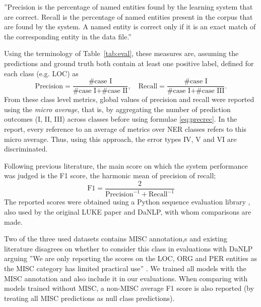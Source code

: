 \documentclass[main.tex]{subfiles}
\begin{document}
''Precision is the percentage of named entities found by the learning system that are correct.
Recall is the percentage of named entities present in the corpus that are found by the system.
A named entity is correct only if it is an exact match of the corresponding entity in the data file.''
\cite[Sec 2.4]{tjang2003conll}

Using the terminology of Table~\ref{tab:eval}, these measures are, assuming the predictions and ground truth both contain at least one positive label, defined for each class (e.g. LOC) as
\begin{equation}
    \label{eq:precrec}
    \text{Precision} = \frac{\text{\# case I}}{\text{\# case I} + \text{\# case II}},\quad \text{Recall} = \frac{\text{\# case I}}{\text{\# case I} + \text{\# case III}}.
\end{equation}
From these class level metrics, global values of precision and recall were reported using the \emph{micro average}, that is, by aggregating the number of prediction outcomes (I, II, III) across classes before using formulae \eqref{eq:precrec}.
In the report, every reference to an average of metrics over NER classes refers to this micro average.
Thus, using this approach, the error types IV, V and VI are discriminated\footnotemark.

Following previous literature, the main score on which the system performance was judged is the F1 score, the harmonic mean of precision of recall;
\begin{equation}
    \label{eq:f1}
    \text{F1} = \dfrac{2}{\text{Precision}^{-1} + \text{Recall}^{-1}}
\end{equation}
The reported scores were obtained using a Python sequence evaluation library \cite{seqeval}, also used by the original LUKE paper and DaNLP, with whom comparisons are made.

Two of the three used datasets contains MISC annotation,s and existing literature disagrees on whether to consider this class in evaluations with DaNLP arguing
''We are only reporting the scores on the LOC, ORG and PER entities as the MISC category has limited practical use'' \cite[Sec. ''Benchmarks'' in NER page]{danlp2021}.
We trained all models with the MISC annotation and also include it in our evaluations.
When comparing with models trained without MISC, a non-MISC average F1 score is also reported (by treating all MISC predictions as null class predictions).
\end{document}
